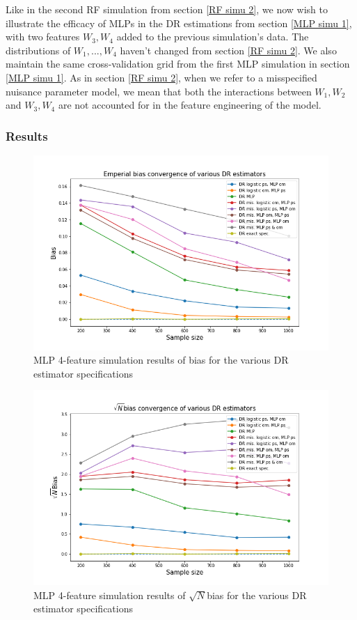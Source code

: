 \documentclass[12pt,twoside]{article}
\begin{document}
Like in the second RF simulation from section \ref{RF simu 2}, we now wish to illustrate the efficacy of MLPs in the DR estimations from section \ref{MLP simu 1}, with two features $W_3, W_4$ added to the previous simulation's data. The distributions of $W_1,..., W_4$ haven't changed from section \ref{RF simu 2}. We also maintain the same cross-validation grid from the first MLP simulation in section \ref{MLP simu 1}. As in section \ref{RF simu 2}, when we refer to a misspecified nuisance parameter model, we mean that both the interactions between $W_1, W_2$ and $W_3, W_4$ are not accounted for in the feature engineering of the model.

\subsubsection*{Results}

\begin{figure}[h!]
    \centering
    \includegraphics[width = 0.9\columnwidth]{figures/biasMLP_moreW.png}
    \caption{MLP 4-feature simulation results of bias for the various DR estimator specifications}
    \label{figbiasMLP_moreW}
\end{figure}

\begin{figure}[h!]
    \centering
    \includegraphics[width = 0.9\columnwidth]{figures/sqrtnMLP_moreW.png}
    \caption{MLP 4-feature simulation results of $\sqrt{N}$bias for the various DR estimator specifications}
    \label{figsqrtnMLP_moreW}
\end{figure}
\end{document}
